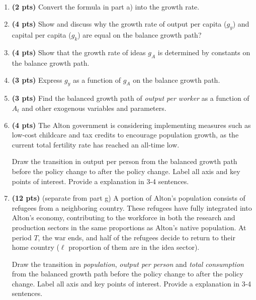\documentclass[14pt, oneside]{memoir}
\begin{document}
\begin{enumerate}[label=\textbf{\arabic*.}, itemsep=15pt]
\begin{enumerate}[label=(\alph*)]
	\item \textbf{(2 pts)} Convert the formula in part a) into the growth rate. 

	\item \textbf{(4 pts)} Show and discuss why the growth rate of output per capita ($g_y$) and capital per capita ($g_k$) are equal on the balance growth path? 


	\item \textbf{(4 pts)} Show that the growth rate of ideas $g_A$ is determined by constants on the balance growth path.
	\clearpage
	
	\item \textbf{(3 pts)} Express $g_y$ as a function of $g_A$ on the balance growth path. 

	\item \textbf{(3 pts)}  Find the balanced growth path of \textit{output per worker} as a function of $A_t$ and other exogenous variables and parameters.
	
	\item \textbf{(4 pts)} The Alton government is considering implementing measures such as low-cost childcare and tax credits to encourage population growth, as the current total fertility rate has reached an all-time low.
	
	Draw the transition in output per person from the balanced growth path before the policy change to after the policy change. Label all axis and key points of interest. Provide a explanation in 3-4 sentences.
	
	\item \textbf{(12 pts)} (separate from part g)  A portion of Alton's population consists of refugees from a neighboring country. These refugees have fully integrated into Alton's economy, contributing to the workforce in both the research and production sectors in the same proportions as Alton's native population. At period \( T \), the war ends, and half of the refugees decide to return to their home country ($\ell$ proportion of them are in the idea sector).	
	
	 Draw the transition in \textit{population}, \textit{output per person} and \textit{total consumption} from the balanced growth path before the policy change to after the policy change. Label all axis and key points of interest. Provide a explanation in 3-4 sentences.
	


\end{enumerate}
\end{enumerate}
\end{document}
